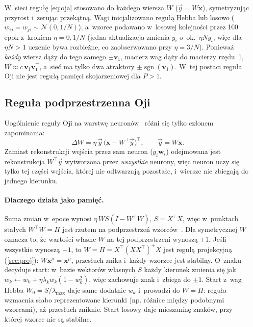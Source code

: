 \documentclass[11pt,a4paper]{article}
\newcommand{\sgn}{\operatorname{sgn}}
\newcommand{\vx}{\mathbf{x}}
\newcommand{\vw}{\mathbf{w}}
\newcommand{\vv}{\mathbf{v}}
\begin{document}
W~sieci regułę \eqref{eq:oja} stosowano do każdego wiersza $W$ ($\vec y=W\vx$), symetryzując
przyrost i~zerując przekątną. Wagi inicjalizowano regułą Hebba lub losowo
($w_{ij}=w_{ji}\sim\mathcal N(0,1/N)$), a~wzorce podawano w~losowej kolejności przez 100 epok
z~krokiem $\eta=0{,}1/N$ (jedna aktualizacja zmienia $y_i$ o~ok.~$\eta N y_i$, więc dla
$\eta N>1$ uczenie bywa rozbieżne, co zaobserwowano przy $\eta=3/N$). Ponieważ \emph{każdy} wiersz dąży do tego samego
$\pm\vv_1$, macierz wag dąży do macierzy rzędu~1, $W\approx c\,\vv_1\vv_1^\top$, a~sieć ma
tylko dwa atraktory $\pm\sgn(\vv_1)$. W~tej postaci reguła Oji nie jest regułą pamięci
skojarzeniowej dla $P>1$.

\subsection{Reguła podprzestrzenna Oji}
\label{sec:oja_subspace}
Uogólnienie reguły Oji na warstwę neuronów~\cite{oja1989} różni się tylko członem zapominania:
\begin{equation}
  \Delta W = \eta\,\vec y\,\bigl(\vx - W^\top\vec y\bigr)^\top, \qquad \vec y=W\vx .
  \label{eq:oja_sub}
\end{equation}
Zamiast rekonstrukcji wejścia przez sam neuron ($y_i\vw_i$) odejmowana jest rekonstrukcja
$W^\top\vec y$ wytworzona przez \emph{wszystkie} neurony, więc neuron uczy się tylko tej części
wejścia, której nie odtwarzają pozostałe, i~wiersze nie zbiegają do jednego kierunku.

\paragraph{Dlaczego działa jako pamięć.}
Suma zmian w~epoce wynosi $\eta\,WS(I-W^\top W)$, $S=X^\top X$, więc w~punktach stałych
$W^\top W=\Pi$ jest rzutem na podprzestrzeń wzorców~\cite{oja1989}. Dla symetrycznej $W$ oznacza
to, że wartości własne $W$ na tej podprzestrzeni wynoszą $\pm1$. Jeśli wszystkie wynoszą $+1$,
to $W=\Pi=X^\top(XX^\top)^+X$ jest regułą projekcyjną (\cref{sec:proj}): $W\vx^\mu=\vx^\mu$,
przesłuch znika i~każdy wzorzec jest stabilny. O~znaku decyduje start: w~bazie wektorów własnych
$S$ każdy kierunek zmienia się jak $w_k\leftarrow w_k+\eta\lambda_k w_k(1-w_k^2)$, więc zachowuje
znak i~zbiega do $\pm1$. Start z~wag Hebba $W_0=S/\lambda_{\max}$ daje same dodatnie $w_k$
i~prowadzi do $W=\Pi$: reguła wzmacnia słabo reprezentowane kierunki (np. różnice między
podobnymi wzorcami), aż przesłuch zniknie. Start losowy daje mieszaninę znaków, przy której
wzorce nie są stabilne.
\end{document}
